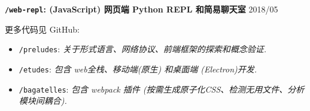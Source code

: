 \documentclass[10pt]{article}
\begin{document}
\vspace{0.5em}
\textbf{\texttt{/web-repl}: (JavaScript) 网页端 Python REPL 和简易聊天室}  \hfill 2018/05 

\vspace{2em}
更多代码见 GitHub: 
\begin{itemize}
\item \texttt{/preludes}: \textit{关于形式语言、网络协议、前端框架的探索和概念验证.}
\item \texttt{/etudes}: \textit{包含 web全栈、移动端\textup(原生\textup) 和桌面端 \textup(Electron\textup)开发.}
\item \texttt{/bagatelles}: \textit{包含 webpack 插件 \textup(按需生成原子化CSS、检测无用文件、分析模块间耦合\textup).}
\end{itemize}
\end{document}
